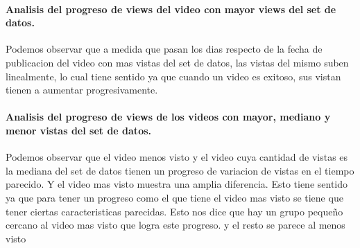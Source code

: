         \paragraph{Analisis del progreso de views del video con mayor views del set de datos.}

            \begin{figure}[ht]
            \end{figure}
        \FloatBarrier
        Podemos observar que a medida que pasan los dias respecto de la fecha de
        publicacion del video con mas vistas del set de datos, las vistas del
        mismo suben linealmente, lo cual tiene sentido ya que cuando un video
        es exitoso, sus vistan tienen a aumentar progresivamente.
        \newpage

        \paragraph{Analisis del progreso de views de los videos con mayor, mediano y menor vistas del set de datos.}

            \begin{figure}[ht]
            \end{figure}
        \FloatBarrier
        Podemos observar que el video menos visto y el video cuya cantidad de
        vistas es la mediana del set de datos tienen un progreso de variacion de
        vistas en el tiempo parecido. Y el video mas visto muestra una amplia
        diferencia. Esto tiene sentido ya que para tener un progreso como el que
        tiene el video mas visto se tiene que tener ciertas caracteristicas
        parecidas. Esto nos dice que hay un grupo pequeño cercano al video mas
        visto que logra este progreso. y el resto se parece al menos visto
        \newpage


